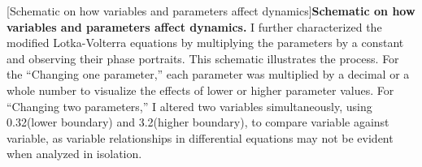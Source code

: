\begin{centering}
\captionsetup{parbox=none}
[Schematic on how variables and parameters affect dynamics]{\textbf{Schematic on how variables and parameters affect dynamics.} I further characterized the modified Lotka-Volterra equations by multiplying the parameters by a constant and observing their phase portraits. This schematic illustrates the process. For the “Changing one parameter,” each parameter was multiplied by a decimal or a whole number to visualize the effects of lower or higher parameter values. For “Changing two parameters,” I altered two variables simultaneously, using 0.32\times (lower boundary) and 3.2\times (higher boundary), to compare variable against variable, as variable relationships in differential equations may not be evident when analyzed in isolation.}
\label{p2:S7a}
\end{centering}

